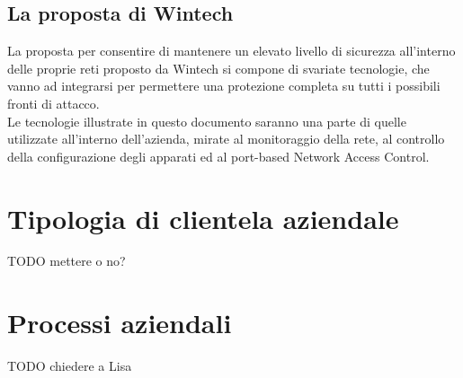 \documentclass[Tesi.tex]{subfiles}
\begin{document}
\subsection{La proposta di Wintech}
La proposta per consentire di mantenere un elevato livello di sicurezza all'interno delle proprie reti proposto da Wintech si compone di svariate tecnologie, che vanno ad integrarsi per permettere una protezione completa su tutti i possibili fronti di attacco. \\
Le tecnologie illustrate in questo documento saranno una parte di quelle utilizzate all'interno dell'azienda, mirate al monitoraggio della rete, al controllo della configurazione degli apparati ed al port-based Network Access Control.

\section{Tipologia di clientela aziendale}
TODO mettere o no?

\section{Processi aziendali}
TODO chiedere a Lisa
\end{document}
